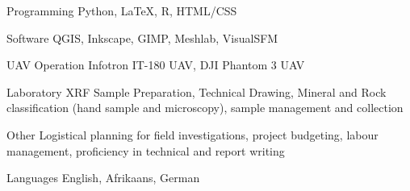 


\begin{cvskills}


\cvskill
{Programming} %
{Python, LaTeX, R, HTML/CSS} %


\cvskill
{Software} %
{QGIS, Inkscape, GIMP, Meshlab, VisualSFM} %


\cvskill
{UAV Operation} %
{Infotron IT-180 UAV, DJI Phantom 3 UAV} %


\cvskill
{Laboratory}
{XRF Sample Preparation, Technical Drawing, Mineral and Rock classification (hand sample and microscopy),}
\cvskill
{}
{sample management and collection}


\cvskill
{Other}
{Logistical planning for field investigations, project budgeting, labour management, proficiency in technical}
\cvskill
{}
{and report writing}


\cvskill
{Languages} %
{English, Afrikaans, German} %


\end{cvskills}